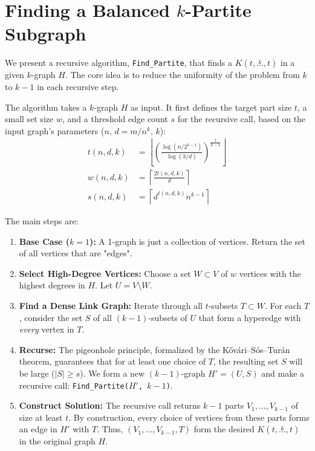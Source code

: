 \documentclass[11pt,a4paper]{article}
\newcommand{\compoverset}[2]{\ensuremath{K(#2, \overset{#1}{\dots}, #2)}}
\theoremstyle{definition}
\begin{document}
\section{Finding a Balanced $k$-Partite Subgraph}\label{sec:finding-a-balanced-$k$-partite-subgraph}

We present a recursive algorithm, \texttt{Find\_Partite}, that finds a $\compoverset{k}{t}$ in a given $k$-graph $H$. The core idea is to reduce the uniformity of the problem from $k$ to $k-1$ in each recursive step.

The algorithm takes a $k$-graph $H$ as input. It first defines the target part size $t$, a small set size $w$, and a threshold edge count $s$ for the recursive call, based on the input graph's parameters ($n$, $d=m/n^k$, $k$):
\begin{align*}
    t(n, d, k) &= \left\lfloor \left(  \frac{\log \left(n/2^{k-1}\right)}{\log (3/d)} \right)^{\frac{1}{k-1}} \right\rfloor \\
    w(n, d, k) &= \left\lceil \frac{2t(n, d, k)}{d} \right\rceil \\
    s(n, d, k) &= \left\lceil d^{t(n, d, k)} n^{k-1} \right\rceil
\end{align*}

The main steps are:
\begin{enumerate}
    \item \textbf{Base Case ($k=1$):} A 1-graph is just a collection of vertices. Return the set of all vertices that are "edges".
    \item \textbf{Select High-Degree Vertices:} Choose a set $W \subset V$ of $w$ vertices with the highest degrees in $H$. Let $U = V \setminus W$.
    \item \textbf{Find a Dense Link Graph:} Iterate through all $t$-subsets $T \subset W$. For each $T$, consider the set $S$ of all $(k-1)$-subsets of $U$ that form a hyperedge with \emph{every} vertex in $T$.
    \item \textbf{Recurse:} The pigeonhole principle, formalized by the Kővári–Sós–Turán theorem, guarantees that for at least one choice of $T$, the resulting set $S$ will be large ($|S| \ge s$). We form a new $(k-1)$-graph $H'=(U, S)$ and make a recursive call: \texttt{Find\_Partite($H'$, $k-1$)}.
    \item \textbf{Construct Solution:} The recursive call returns $k-1$ parts $V_1, \dots, V_{k-1}$ of size at least $t$. By construction, every choice of vertices from these parts forms an edge in $H'$ with $T$. Thus, $(V_1, \dots, V_{k-1}, T)$ form the desired $\compoverset{k}{t}$ in the original graph $H$.
\end{enumerate}
\end{document}
